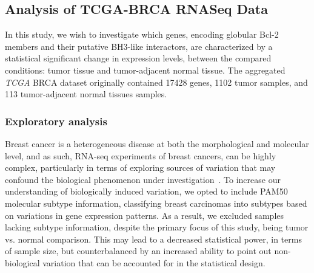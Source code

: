 \documentclass[10pt,letterpaper]{article}
\begin{document}
\subsection*{Analysis of TCGA-BRCA RNASeq Data}
In this study, we wish to investigate which genes, encoding globular Bcl-2 members and their putative BH3-like interactors, are characterized by a statistical significant change in expression levels, between the compared conditions: tumor tissue and tumor-adjacent normal tissue. The aggregated \textit{TCGA} BRCA dataset originally contained 17428 genes, 1102 tumor samples, and 113 tumor-adjacent normal tissues samples.

\subsubsection*{Exploratory analysis}
Breast cancer is a heterogeneous disease at both the morphological and molecular level, and as such, RNA-seq experiments of breast cancers, can be highly complex, particularly in terms of exploring sources of variation that may confound the biological phenomenon under investigation~\cite{Heng2017}. To increase our understanding of biologically induced variation, we opted to include PAM50 molecular subtype information, classifying breast carcinomas into subtypes based on variations in gene expression patterns. As a result, we excluded samples lacking subtype information, despite the primary focus of this study, being tumor vs. normal comparison. This may lead to a decreased statistical power, in terms of sample size, but counterbalanced by an increased ability to point out non-biological variation that can be accounted for in the statistical design.
\end{document}

